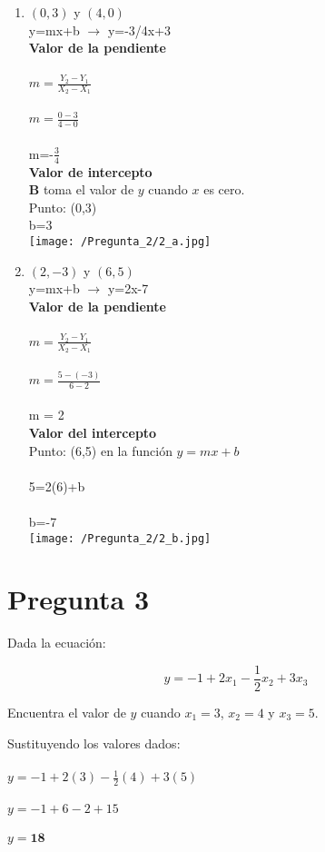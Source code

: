 \documentclass[]{article}
\begin{document}
\begin{enumerate} [label=\alph*)]
	\item $(0,3)$ y $(4,0)$\\
	y=mx+b $\rightarrow$ y=-3/4x+3
	\\
	\textbf{Valor de la pendiente}
	\\\\
	$m = \frac{Y_2 - Y_1}{X_2 - X_1}$
	\\\\
	$m = \frac{0-3}{4-0}$
	\\\\
	m=-$\frac{3}{4}$
	\\
	\textbf{Valor de intercepto}
	\\
	\textbf{B} toma el valor de $y$ cuando $x$ es cero.
	\\
	Punto: (0,3)\\
	b=3\\
	\texttt{[image: /Pregunta\_2/2\_a.jpg]}
	\item $(2,-3)$ y $(6,5)$
	\\
	y=mx+b $\rightarrow$ y=2x-7
	\\
	\textbf{Valor de la pendiente}
	\\\\
	$m = \frac{Y_2-Y_1}{X_2-X_1}$
	\\\\
	$m = \frac{5-(-3)}{6-2}$
	\\\\
	m = 2\\
	\textbf{Valor del intercepto}\\
	Punto: (6,5) en la función $y = mx+b$\\\\
	5=2(6)+b\\\\
	b=-7\\
	\texttt{[image: /Pregunta\_2/2\_b.jpg]}
\end{enumerate}
 
\section*{Pregunta 3}
Dada la ecuación: 

$$y=-1+2x_1-\frac{1}{2}x_2+3x_3$$

Encuentra el valor de $y$ cuando $x_1=3$, $x_2=4$ y $x_3=5$.

Sustituyendo los valores dados:\\\\
$y = -1+2(3)-\frac{1}{2}(4)+3(5)$\\\\
$y = -1+6-2+15$\\\\
$y=\textbf{18}$
\end{document}
